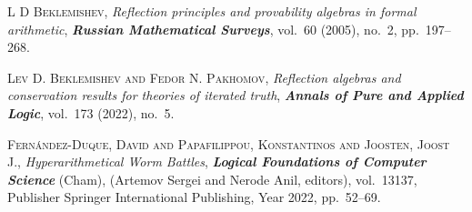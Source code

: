 \documentclass[bsl,meeting]{asl}
\begin{document}
\begin{thebibliography}{10}

{\scshape L D Beklemishev},
{\itshape Reflection principles and provability algebras in formal arithmetic},
{\bfseries\itshape Russian Mathematical Surveys},
vol.~60 (2005), no.~2, pp.~197--268.

{\scshape Lev D. Beklemishev and Fedor N. Pakhomov},
{\itshape Reflection algebras and conservation results for theories of iterated truth},
{\bfseries\itshape Annals of Pure and Applied Logic},
vol.~173 (2022), no.~5.

{\scshape Fern{\'a}ndez-Duque, David
and Papafilippou, Konstantinos
and Joosten, Joost J.},
{\itshape Hyperarithmetical Worm Battles},
{\bfseries\itshape Logical Foundations of Computer Science}
(Cham),
(Artemov Sergei and Nerode Anil, editors),
vol.~13137,
Publisher Springer International Publishing,
Year 2022,
pp.~52--69.

\end{thebibliography}

\vspace*{-0.5\baselineskip}
\end{document}
